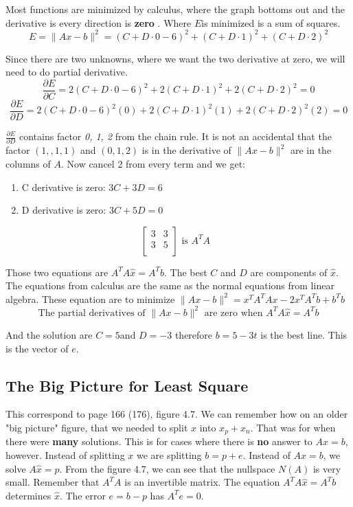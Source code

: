 Most functions are minimized by calculus, where the graph bottoms out and the derivative is every direction is \textbf{zero} . Where \(E\)is minimized is a sum of squares. 
\[
    E = \lVert Ax - b \rVert^2 = (C + D \cdot 0 - 6)^2 + (C + D \cdot 1)^2 + (C + D \cdot 2)^2 
\] 

Since there are two unknowns, where we want the two derivative at zero, we will need to do partial derivative. 
\[
    \frac{\partial E}{\partial C} = 2(C + D \cdot 0 - 6)^2 + 2(C + D \cdot 1)^2 + 2(C + D \cdot 2)^2 = 0
\]
\[
    \frac{\partial E}{\partial D} = 2(C + D \cdot 0 - 6)^2 (0) + 2(C + D \cdot 1)^2 (1) + 2(C + D \cdot 2)^2 (2) = 0
\]

\(\frac{\partial E}{\partial D}\) contains factor \emph{0, 1, 2} from the chain rule. It is not an accidental that the factor \((1, ,1 ,1)\) and \((0,1,2)\) is in the derivative of \(\lVert Ax - b \rVert^2 \) are in the columns of \(A\). Now cancel 2 from every term and we get: 
\begin{enumerate}
    \item C derivative is zero: \(3C + 3D = 6\)
    \item D derivative is zero: \(3C + 5D = 0\) 
\end{enumerate}     
\[
    \begin{bmatrix}
        3 & 3  \\
        3 & 5  \\
    \end{bmatrix}
    \text{ is \(A^T A\) }
\]

Those two equations are \(A^T A \hat{x} = A^T b\). The best \(C\) and \(D\) are components of \(\hat{x}\). The equations from calculus are the same as the normal equations from linear algebra. These equation are to minimize \(\lVert Ax - b \rVert^2 = x^T A^T Ax - 2x^T A^T b + b^T b \)
\[
    \text{The partial derivatives of  } \lVert Ax - b \rVert^2 \text{ are zero when } A^T A\hat{x} = A^T b  
\]     

And the solution are \(C = 5\)and \(D = -3\) therefore \(b = 5 - 3t\) is the best line. This is the vector of \(e\). 

\subsection{The Big Picture for Least Square}

This correspond to page 166 (176), figure 4.7. We can remember  how on an older "big picture" figure, that we needed to split \(x\) into \(x_p + x_n\). That was for when there were \textbf{many} solutions. This is for cases where there is \textbf{no} answer to \(Ax = b\), however. Instead of splitting \(x\) we are splitting \(b = p + e\). Instead of \(Ax = b\), we solve \(A\hat{x} = p\). 
From the figure 4.7, we can see that the nullspace \(N(A)\) is very small. Remember that \(A^T A\) is an invertible matrix. The equation \(A^T A \hat{x} = A^T b\) determines \(\hat{x}\). The error \(e = b - p\) has \(A^T e = 0\). 

